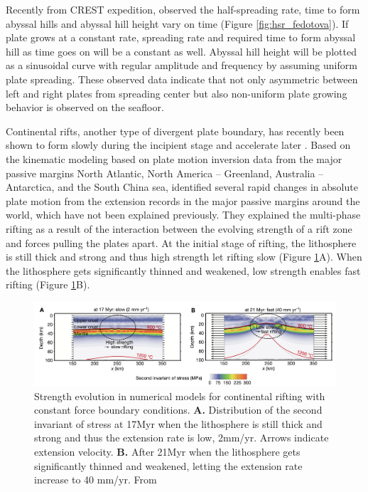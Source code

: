 \documentclass[letterpaper,12pt,notitle]{memphisthesis}                     %
\begin{document}
Recently from CREST expedition, \citet{Fedotova2017} observed the half-spreading rate, time to form abyssal hills and abyssal hill height vary on time  (Figure \ref{fig:hsr_fedotova}). %
If plate grows at a constant rate, spreading rate and required time to form abyssal hill as time goes on will be a constant as well. Abyssal hill height will be plotted as a sinusoidal curve with regular amplitude and frequency by assuming uniform plate spreading. These observed data indicate that not only asymmetric between left and right plates from spreading center but also non-uniform plate growing behavior is observed on the seafloor.

Continental rifts, another type of divergent plate boundary, has recently been shown to form slowly during the incipient stage and accelerate later \citep{Brune2016}. Based on the kinematic modeling based on plate motion inversion data from the major passive margins North Atlantic, North America – Greenland, Australia – Antarctica, and the South China sea, \citet{Brune2016} identified several rapid changes in absolute plate motion from the extension records in the major passive margins around the world, which have not been explained previously. They explained the multi-phase rifting as a result of the interaction between the evolving strength of a rift zone and forces pulling the plates apart. At the initial stage of rifting, the lithosphere is still thick and strong and thus high strength let rifting slow (Figure \ref{fig:brune}A). When the lithosphere gets significantly thinned and weakened, low strength enables fast rifting (Figure \ref{fig:brune}B).
%
\begin{figure}[!htb]
	\centering
	\includegraphics[width=0.99\linewidth]{./figs/brune.png}
	\caption{Strength evolution in numerical models for continental rifting with constant force boundary conditions. \textbf{A.} Distribution of the second invariant of stress at 17Myr when the lithosphere is still thick and strong and thus the extension rate is low, 2mm/yr. Arrows indicate extension velocity. \textbf{B.} After 21Myr when the lithosphere gets significantly thinned and weakened, letting the extension rate increase to 40 mm/yr. From \citet{Brune2016}}
	\label{fig:brune}
\end{figure}
\end{document}
